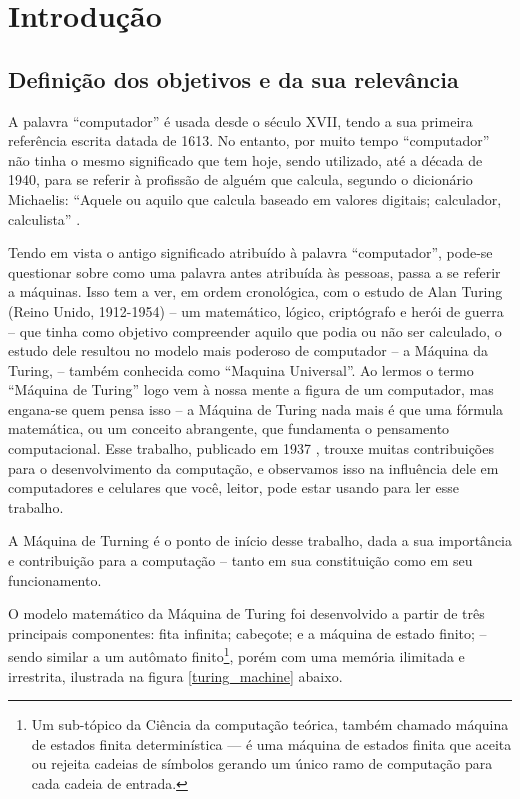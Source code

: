 \section{Introdução} 
\label{introduction}
\subsection{Definição dos objetivos e da sua relevância}
A palavra ``computador'' é usada desde o século XVII, tendo a sua primeira referência escrita datada de 1613. No entanto, por muito tempo ``computador'' não tinha o mesmo significado que tem hoje, sendo utilizado, até a década de 1940, para se referir à profissão de alguém que calcula, segundo o dicionário Michaelis: ``Aquele ou aquilo que calcula baseado em valores digitais; calculador, calculista'' \cite{4}.

Tendo em vista o antigo significado atribuído à palavra ``computador'', pode-se questionar sobre como uma palavra antes atribuída às pessoas, passa a se referir a máquinas. Isso tem a ver, em ordem cronológica, com o estudo de Alan Turing (Reino Unido, 1912-1954) – um matemático, lógico, criptógrafo e herói de guerra – que tinha como objetivo compreender aquilo que podia ou não ser calculado, o estudo dele resultou no modelo mais poderoso de computador – a Máquina da Turing, – também conhecida como ``Maquina Universal''. Ao lermos o termo ``Máquina de Turing'' logo vem à nossa mente a figura de um computador, mas engana-se quem pensa isso – a Máquina de Turing nada mais é que uma fórmula matemática, ou um conceito abrangente, que fundamenta o pensamento computacional. Esse trabalho, publicado em 1937 \cite{8}, trouxe muitas contribuições para o desenvolvimento da computação, e observamos isso na influência dele em computadores e celulares que você, leitor, pode estar usando para ler esse  trabalho.  

A Máquina de Turning é o ponto de início desse trabalho, dada a sua importância e contribuição para a computação – tanto em sua constituição como em seu funcionamento. 

O modelo matemático da Máquina de Turing foi desenvolvido a partir de três principais componentes: fita infinita; cabeçote; e a máquina de estado finito; – sendo similar a um autômato finito\footnote{Um sub-tópico da Ciência da computação teórica, também chamado máquina de estados finita determinística — é uma máquina de estados finita que aceita ou rejeita cadeias de símbolos gerando um único ramo de computação para cada cadeia de entrada.}, porém com uma memória ilimitada e irrestrita, ilustrada na figura \ref{turing_machine} abaixo.

